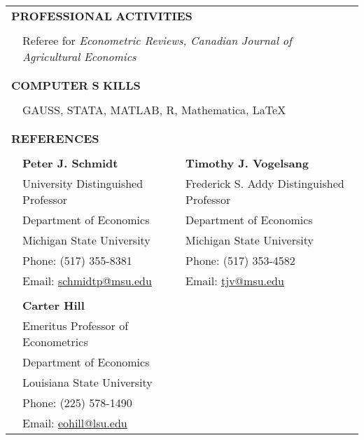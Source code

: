 \documentclass[10pt]{article}
\begin{document}
\begin{center}
\begin{tabular}{llllr}
\multicolumn{5}{l}{{\Large \textbf{P}}\textbf{ROFESSIONAL} {\Large \textbf{A}}\textbf{CTIVITIES}}\\
\multicolumn{5}{l}{} \\
& \multicolumn{4}{l}{Referee for \emph{Econometric Reviews, Canadian Journal of Agricultural Economics}}\\
\multicolumn{5}{l}{}\\\\
\multicolumn{5}{l}{{\Large \textbf{C}}\textbf{OMPUTER} {\Large \textbf{S}}%
\textbf{KILLS}}  \\
\multicolumn{5}{l}{}\\
&\multicolumn{4}{l}{GAUSS, STATA, MATLAB, R, Mathematica, \LaTeX}\\
%
\multicolumn{5}{l}{}\\\\
\multicolumn{5}{l}{{\Large \textbf{R}}\textbf{EFERENCES}}\\
\multicolumn{1}{p{20pt}}{}&\multicolumn{1}{p{100pt}}{}&\multicolumn{1}{p{80pt}}{}&\multicolumn{1}{p{100pt}}{}&\multicolumn{1}{p{400pt}}{}\\
\multicolumn{1}{p{10pt}}{}&\multicolumn{2}{l}{\textbf{Peter J. Schmidt}} & \multicolumn{2}{l}{\textbf{Timothy J. Vogelsang}} \\
&\multicolumn{2}{l}{University Distinguished Professor} &\multicolumn{2}{l}{Frederick S. Addy Distinguished Professor} \\
&\multicolumn{2}{l}{Department of Economics} &\multicolumn{2}{l}{Department of Economics} \\
&\multicolumn{2}{l}{Michigan State University} &\multicolumn{2}{l}{Michigan State University}\\
&\multicolumn{2}{l}{Phone: (517) 355-8381}&\multicolumn{2}{l}{Phone: (517) 353-4582} \\
&\multicolumn{2}{l}{Email:  \href{mailto:schmidtp@msu.edu}{schmidtp@msu.edu}}&\multicolumn{2}{l}{Email: \href{mailto:tjv@msu.edu}{tjv@msu.edu}}\\ 
\multicolumn{5}{l}{}\\
& \multicolumn{2}{l}{\textbf{Carter Hill}}&\multicolumn{2}{l}{}\\
&\multicolumn{2}{l}{Emeritus Professor of Econometrics}&\multicolumn{2}{l}{}\\
& \multicolumn{2}{l}{Department of Economics}&\multicolumn{2}{l}{}\\
&\multicolumn{2}{l}{Louisiana State University}&\multicolumn{2}{l}{}\\
&\multicolumn{2}{l}{Phone: (225) 578-1490}&\multicolumn{2}{l}{}\\
&\multicolumn{2}{l}{Email:  \href{mailto:eohill@lsu.edu}{eohill@lsu.edu}}&\multicolumn{2}{l}{}
\end{tabular}

\end{center}
\end{document}
